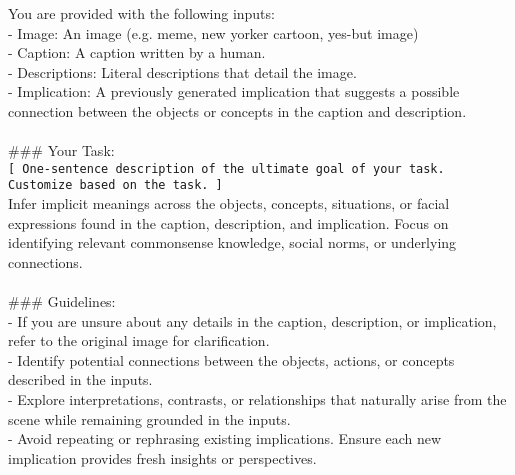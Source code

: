 \begin{figure*}[t]
\small

\begin{tcolorbox}[
    title=Prompt for Non-Seed Implications (2nd hop onward),
    colback=white,
    colframe=Green,
    arc=0pt,        %
    outer arc=0pt,  %
]

You are provided with the following inputs:\\
- \text{[}Image\text{]}: An image (e.g. meme, new yorker cartoon, yes-but image)\\
- \text{[}Caption\text{]}: A caption written by a human.\\
- \text{[}Descriptions\text{]}: Literal descriptions that detail the image.\\
- \text{[}Implication\text{]}: A previously generated implication that suggests a possible connection between the objects or concepts in the caption and description.\\
\\
\#\#\# Your Task:\\
\texttt{[ One-sentence description of the ultimate goal of your task. Customize based on the task. ]}\\
Infer implicit meanings across the objects, concepts, situations, or facial expressions found in the caption, description, and implication. Focus on identifying relevant commonsense knowledge, social norms, or underlying connections.\\
\\
\#\#\# Guidelines:\\
- If you are unsure about any details in the caption, description, or implication, refer to the original image for clarification.\\
- Identify potential connections between the objects, actions, or concepts described in the inputs.\\
- Explore interpretations, contrasts, or relationships that naturally arise from the scene while remaining grounded in the inputs.\\
- Avoid repeating or rephrasing existing implications. Ensure each new implication provides fresh insights or perspectives.\\

\end{tcolorbox}
\end{figure*}

